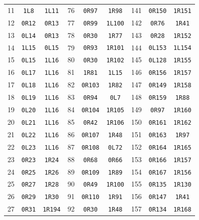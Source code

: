 \documentclass[10pt,a4paper]{article}
\begin{document}
\begin{center}
\begin{tabular}{rcc@{\hspace{14pt}}rcc@{\hspace{14pt}}rcc}
11 & \texttt{1L8} & \texttt{1L11} & 76 & \texttt{0R97} & \texttt{1R98} & 141 & \texttt{0R150} & \texttt{1R151} \\
12 & \texttt{0R12} & \texttt{0R13} & 77 & \texttt{0R99} & \texttt{1L100} & 142 & \texttt{0R76} & \texttt{1R41} \\
13 & \texttt{0L14} & \texttt{0R13} & 78 & \texttt{0R30} & \texttt{1R77} & 143 & \texttt{0R28} & \texttt{1R152} \\
14 & \texttt{1L15} & \texttt{0L15} & 79 & \texttt{0R93} & \texttt{1R101} & 144 & \texttt{0L153} & \texttt{1L154} \\
15 & \texttt{0L15} & \texttt{1L16} & 80 & \texttt{0R30} & \texttt{1R102} & 145 & \texttt{0L128} & \texttt{1R155} \\
16 & \texttt{0L17} & \texttt{1L16} & 81 & \texttt{1R81} & \texttt{1L15} & 146 & \texttt{0R156} & \texttt{1R157} \\
17 & \texttt{0L18} & \texttt{1L16} & 82 & \texttt{0R103} & \texttt{1R82} & 147 & \texttt{0R149} & \texttt{1R158} \\
18 & \texttt{0L19} & \texttt{1L16} & 83 & \texttt{0R94} & \texttt{0L7} & 148 & \texttt{0R159} & \texttt{1R88} \\
19 & \texttt{0L20} & \texttt{1L16} & 84 & \texttt{0R104} & \texttt{1R105} & 149 & \texttt{0R97} & \texttt{1R160} \\
20 & \texttt{0L21} & \texttt{1L16} & 85 & \texttt{0R42} & \texttt{1R106} & 150 & \texttt{0R161} & \texttt{1R162} \\
21 & \texttt{0L22} & \texttt{1L16} & 86 & \texttt{0R107} & \texttt{1R48} & 151 & \texttt{0R163} & \texttt{1R97} \\
22 & \texttt{0L23} & \texttt{1L16} & 87 & \texttt{0R108} & \texttt{0L72} & 152 & \texttt{0R164} & \texttt{1R165} \\
23 & \texttt{0R23} & \texttt{1R24} & 88 & \texttt{0R68} & \texttt{0R66} & 153 & \texttt{0R166} & \texttt{1R157} \\
24 & \texttt{0R25} & \texttt{1R26} & 89 & \texttt{0R109} & \texttt{1R89} & 154 & \texttt{0R167} & \texttt{1R156} \\
25 & \texttt{0R27} & \texttt{1R28} & 90 & \texttt{0R49} & \texttt{1R100} & 155 & \texttt{0R135} & \texttt{1R130} \\
26 & \texttt{0R29} & \texttt{1R30} & 91 & \texttt{0R110} & \texttt{1R91} & 156 & \texttt{0R147} & \texttt{1R41} \\
27 & \texttt{0R31} & \texttt{1R194} & 92 & \texttt{0R30} & \texttt{1R48} & 157 & \texttt{0R134} & \texttt{1R168} \\

\end{tabular}
\end{center}
\end{document}
